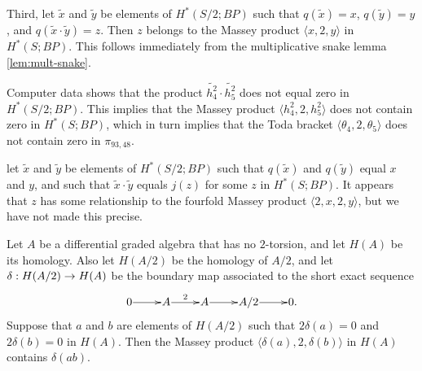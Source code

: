 Third, let $\widetilde{x}$ and $\widetilde{y}$ be elements of
$H^*(S/2; BP)$ such that 
$q(\widetilde{x}) = x$, $q(\widetilde{y}) = y$, and
$q(\widetilde{x} \cdot \widetilde{y}) = z$.
Then $z$ belongs to the Massey product
$\langle x, 2, y \rangle$ in $H^*(S; BP)$.  This follows
immediately from the multiplicative snake lemma \ref{lem:mult-snake}.

\begin{ex}
Computer data shows that 
the product $\widetilde{h_4^2} \cdot \widetilde{h_5^2}$ does not equal
zero in $H^*(S/2;BP)$.  This implies that the
Massey product $\langle h_4^2, 2, h_5^2 \rangle$ does not contain zero in
$H^*(S; BP)$, which in turn implies that
the Toda bracket $\langle \theta_4, 2, \theta_5 \rangle$
does not contain zero in $\pi_{93,48}$.
\end{ex}

\begin{remark}
let $\widetilde{x}$ and $\widetilde{y}$ be elements of
$H^*(S/2; BP)$ such that 
$q(\widetilde{x})$ and $q(\widetilde{y})$ equal $x$ and $y$, and
such that
$\widetilde{x} \cdot \widetilde{y}$
equals $j(z)$ for some $z$ in $H^*(S; BP)$.
It appears that $z$ has some relationship to the fourfold Massey
product $\langle 2, x, 2, y \rangle$, but we have not made this precise.
\end{remark}

\begin{lemma}
\label{lem:mult-snake}
Let $A$ be a differential graded algebra that has no $2$-torsion, 
and let $H(A)$ be its homology.  Also let $H(A/2)$ be the homology
of $A/2$, and let $\delta: H(A/2) \rightarrow H(A)$ be the boundary
map associated to the short exact sequence
\[
\xymatrix@1{
0 \ar[r] & A \ar[r]^2 & A \ar[r] & A/2 \ar[r] & 0.
}
\]
Suppose that $a$ and $b$ are elements of $H(A/2)$ such that 
$2 \delta(a) = 0$ and $2 \delta(b) = 0$ in $H(A)$.
Then the Massey product $\langle \delta(a), 2, \delta(b) \rangle$
in $H(A)$
contains $\delta(a b)$.
\end{lemma}

